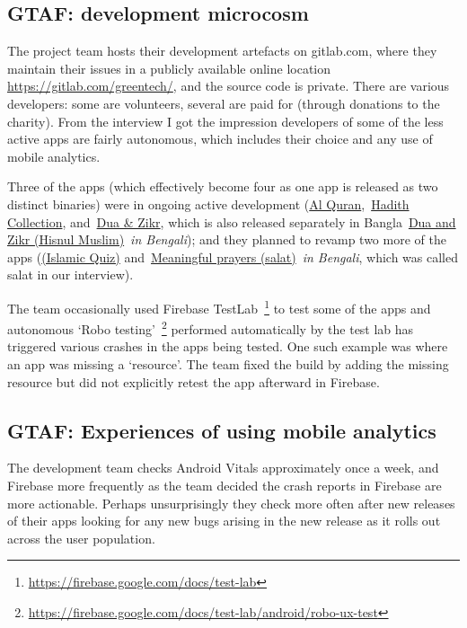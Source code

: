 \subsection{GTAF: development microcosm} 
The project team hosts their development artefacts on gitlab.com, where they maintain their issues in a publicly available online location \url{https://gitlab.com/greentech/}, and the source code is private. There are various developers: some are volunteers, several are paid for (through donations to the charity). From the interview I got the impression developers of some of the less active apps are fairly autonomous, which includes their choice and any use of mobile analytics. 

Three of the apps (which effectively become four as one app is released as two distinct binaries) were in ongoing active development (\href{https://play.google.com/store/apps/details?id=com.greentech.quran}{Al Quran},~\href{https://play.google.com/store/apps/details?id=com.greentech.hadith}{Hadith Collection}, and~\href{https://play.google.com/store/apps/details?id=com.greentech.hisnulmuslim}{Dua \& Zikr}, which is also released separately in Bangla~\href{https://play.google.com/store/apps/details?id=com.greentech.hisnulmuslimbn}{{Dua and Zikr (Hisnul Muslim)}}~\emph{in Bengali}); and they planned to revamp two more of the apps (\href{https://play.google.com/store/apps/details?id=com.greentech.islamicquiz}{(Islamic Quiz)} and~\href{https://play.google.com/store/apps/details?id=com.greentech.salatbn}{Meaningful prayers (salat)}~\textit{in Bengali}, which was called salat in our interview).

The team occasionally used Firebase TestLab~\footnote{\url{https://firebase.google.com/docs/test-lab}} to test some of the apps and autonomous `Robo testing'~\footnote{\url{https://firebase.google.com/docs/test-lab/android/robo-ux-test}} performed automatically by the test lab has triggered various crashes in the apps being tested. One such example was where an app was missing a `resource'. The team fixed the build by adding the missing resource but did not explicitly retest the app afterward in Firebase.  

\subsection{GTAF: Experiences of using mobile analytics}
The development team checks Android Vitals approximately once a week, and Firebase more frequently as the team decided the crash reports in Firebase are more actionable. Perhaps unsurprisingly they check more often after new releases of their apps looking for any new bugs arising in the new release as it rolls out across the user population.

